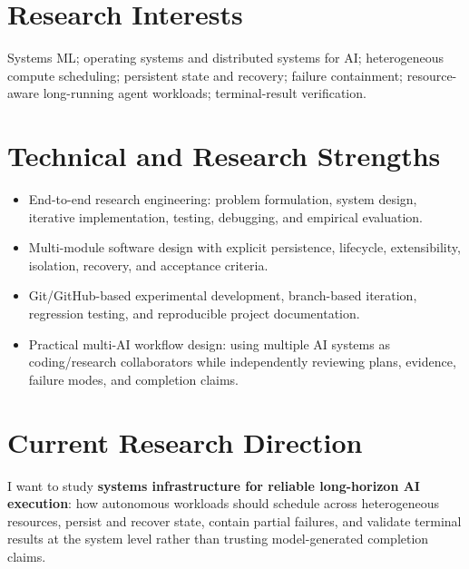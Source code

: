 \documentclass[10pt,a4paper]{article}
\begin{document}
\section{Research Interests}
Systems ML; operating systems and distributed systems for AI; heterogeneous compute scheduling; persistent state and recovery; failure containment; resource-aware long-running agent workloads; terminal-result verification.

\section{Technical and Research Strengths}
\begin{itemize}
  \item End-to-end research engineering: problem formulation, system design, iterative implementation, testing, debugging, and empirical evaluation.
  \item Multi-module software design with explicit persistence, lifecycle, extensibility, isolation, recovery, and acceptance criteria.
  \item Git/GitHub-based experimental development, branch-based iteration, regression testing, and reproducible project documentation.
  \item Practical multi-AI workflow design: using multiple AI systems as coding/research collaborators while independently reviewing plans, evidence, failure modes, and completion claims.
\end{itemize}

\section{Current Research Direction}
I want to study \textbf{systems infrastructure for reliable long-horizon AI execution}: how autonomous workloads should schedule across heterogeneous resources, persist and recover state, contain partial failures, and validate terminal results at the system level rather than trusting model-generated completion claims.
\end{document}
